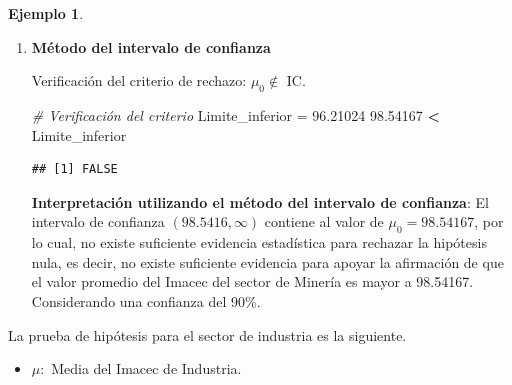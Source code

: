 \documentclass[
  11pt,
]{book}
\newenvironment{Shaded}{\begin{snugshade}}{\end{snugshade}}
\newcommand{\CommentTok}[1]{\textcolor[rgb]{0.56,0.35,0.01}{\textit{#1}}}
\newcommand{\FloatTok}[1]{\textcolor[rgb]{0.00,0.00,0.81}{#1}}
\newcommand{\NormalTok}[1]{#1}
\newcommand{\OtherTok}[1]{\textcolor[rgb]{0.56,0.35,0.01}{#1}}
\newcommand{\SpecialCharTok}[1]{\textcolor[rgb]{0.81,0.36,0.00}{\textbf{#1}}}
\providecommand{\tightlist}{%
  \setlength{\itemsep}{0pt}\setlength{\parskip}{0pt}}
\theoremstyle{definition}
\theoremstyle{definition}
\newtheorem{example}{Ejemplo}[chapter]
\theoremstyle{definition}
\theoremstyle{definition}
\theoremstyle{remark}
\begin{document}
\begin{example}
\begin{enumerate}
\begin{Shaded}
\begin{Highlighting}[]
\CommentTok{\# Verificación el criterio}
\NormalTok{t0 }\OtherTok{=} \SpecialCharTok{{-}}\FloatTok{1.2773}
\NormalTok{t0 }\SpecialCharTok{\textgreater{}=}\NormalTok{ valor\_critico}
\end{Highlighting}
\end{Shaded}

\begin{verbatim}
## [1] FALSE
\end{verbatim}

  \textbf{Interpretación utilizando el método del valor crítico}: El estadístico de prueba de -1.2773 no es mayor o igual al valor crítico de 1.2977, por lo cual, no existe suficiente evidencia estadística para rechazar la hipótesis nula, es decir, no existe suficiente evidencia para apoyar la afirmación de que el valor promedio del Imacec del sector de Minería es mayor a 98.54167. Considerando una confianza del 90\%.
\item
  \textbf{Método del intervalo de confianza}

  Verificación del criterio de rechazo: \(\mu_0 \notin\) IC.

\begin{Shaded}
\begin{Highlighting}[]
\CommentTok{\# Verificación del criterio}
\NormalTok{Limite\_inferior }\OtherTok{=} \FloatTok{96.21024}
\FloatTok{98.54167} \SpecialCharTok{\textless{}}\NormalTok{ Limite\_inferior}
\end{Highlighting}
\end{Shaded}

\begin{verbatim}
## [1] FALSE
\end{verbatim}

  \textbf{Interpretación utilizando el método del intervalo de confianza}: El intervalo de confianza \((98.5416, \infty)\) contiene al valor de \(\mu_0 = 98.54167\), por lo cual, no existe suficiente evidencia estadística para rechazar la hipótesis nula, es decir, no existe suficiente evidencia para apoyar la afirmación de que el valor promedio del Imacec del sector de Minería es mayor a 98.54167. Considerando una confianza del 90\%.
\end{enumerate}

La prueba de hipótesis para el sector de industria es la siguiente.

\begin{itemize}
\tightlist
\item
  \(\mu:\) Media del Imacec de Industria.
\end{itemize}


\end{example}
\end{document}
